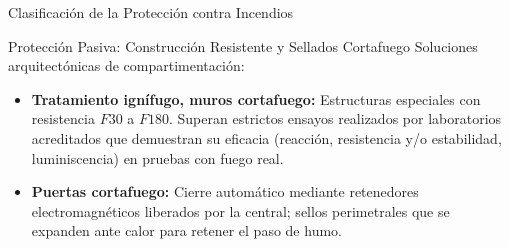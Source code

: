 \begin{frame}{Clasificación de la Protección contra Incendios}
{
  }


\end{frame}

\begin{frame}{Protección Pasiva: Construcción Resistente y Sellados Cortafuego}
  \small
  Soluciones arquitectónicas de compartimentación:
  \vspace{0.3cm}
  \begin{itemize}
    \setlength{\itemsep}{0.35cm}
    \item \textbf{Tratamiento ignífugo, muros cortafuego:} Estructuras especiales con resistencia $F30$ a $F180$. Superan estrictos ensayos realizados por laboratorios acreditados que demuestran su eficacia (reacción, resistencia y/o estabilidad, luminiscencia) en pruebas con fuego real.
    \item \textbf{Puertas cortafuego:} Cierre automático mediante retenedores electromagnéticos liberados por la central; sellos perimetrales que se expanden ante calor para retener el paso de humo.
  \end{itemize}
\end{frame}

